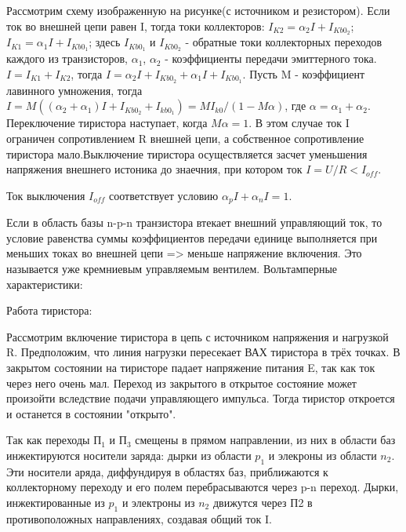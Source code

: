 Рассмотрим схему изображенную на рисунке(с источником и резистором). Если ток во внешней цепи равен I, тогда токи коллекторов:
$I_{K2} = \alpha_2I+I_{Kb0}_2$; $I_{K1} = \alpha_1I+I_{Kb0}_1$;
здесь $I_{Kb0}_1$ и $I_{Kb0}_2$ - обратные токи коллекторных переходов каждого из транзисторов, $\alpha_1$, $\alpha_2$ - коэффициенты передачи эмиттерного тока. $I = I_{K1}+I_{K2}$, тогда  $I = \alpha_2I+I_{Kb0}_2+\alpha_1I+I_{Kb0}_1$.
Пусть M - коэффициент лавинного умножения, тогда $I = M( (\alpha_2+\alpha_1)I+I_{Kb0}_2+I_{kb0}_1) = MI_{k0}/(1-M\alpha) $, где $\alpha = \alpha_1+\alpha_2$. Переключение тиристора наступает, когда $M\alpha = 1$. В этом случае ток I ограничен сопротивлением R внешней цепи, а собственное сопротивление тиристора мало.Выключение тиристора осуществляется засчет уменьшения напряжения внешнего истоника до знаечния, при котором ток $I=U/R < I_{off}$.

Ток выключения $I_{off}$ соответствует условию $\alpha_pI + \alpha_nI = 1$.

Если в область базы n-p-n транзистора втекает внешний управляющий ток, то условие равенства суммы коэффициентов передачи единице выполняется при меньших токах во внешней цепи => меньше напряжение включения. Это называется уже кремниевым управляемым вентилем. Вольтамперные характеристики:

\begin{center}
	\begin{figure}[h!]
		\caption{}	
	\end{figure}
\end{center}

Работа тиристора:
\begin{center}
	\begin{figure}[h!]
		\caption{}	
	\end{figure}
\end{center}

Рассмотрим включение тиристора в цепь с источником напряжения и нагрузкой R. Предположим, что линия нагрузки пересекает ВАХ тиристора в трёх точках. В закрытом состоянии на тиристоре падает напряжение питания E, так как ток через него очень мал. Переход из закрытого в открытое состояние может произойти вследствие подачи управляющего импульса. Тогда тиристор откроется и останется в состоянии "открыто".

Так как переходы П$_1$ и П$_3$ смещены в прямом направлении, из них в области баз инжектируются носители заряда: дырки из области $p_1$ и элекроны из области $n_2$. Эти носители аряда, диффундируя в областях баз, приближаются к коллекторному переходу и его полем перебрасываются через p-n переход. Дырки, инжектированные из $p_1$ и электроны из $n_2$ движутся через П2 в противоположных направлениях, создавая общий ток I.

